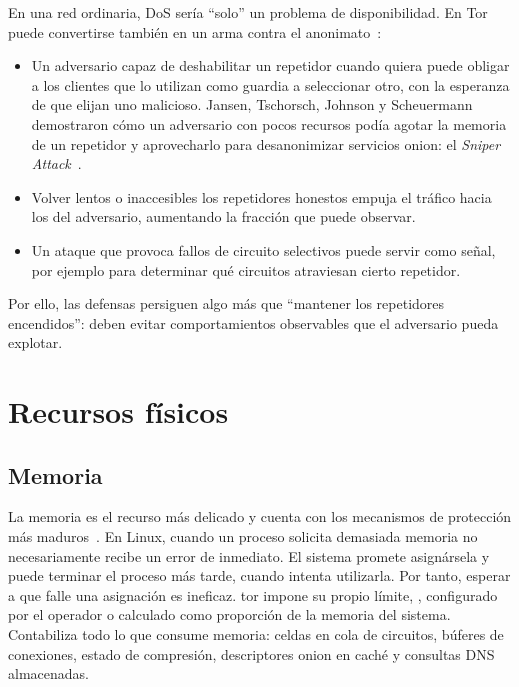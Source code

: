 En una red ordinaria, DoS sería \enquote{solo} un problema de disponibilidad. En Tor puede convertirse también en un arma contra el anonimato~:
\begin{itemize}
  \item Un adversario capaz de deshabilitar un repetidor cuando quiera puede obligar a los clientes que lo utilizan como guardia a seleccionar otro, con la esperanza de que elijan uno malicioso. Jansen, Tschorsch, Johnson y Scheuermann demostraron cómo un adversario con pocos recursos podía agotar la memoria de un repetidor y aprovecharlo para desanonimizar servicios onion: el \emph{Sniper Attack}~\cite{jansen2014sniper}.
  \item Volver lentos o inaccesibles los repetidores honestos empuja el tráfico hacia los del adversario, aumentando la fracción que puede observar.
  \item Un ataque que provoca fallos de circuito selectivos puede servir como señal, por ejemplo para determinar qué circuitos atraviesan cierto repetidor.
\end{itemize}

Por ello, las defensas persiguen algo más que \enquote{mantener los repetidores encendidos}: deben evitar comportamientos observables que el adversario pueda explotar.

\section{Recursos físicos}\label{sec:dos-risorse}

\subsection{Memoria}

La memoria es el recurso más delicado y cuenta con los mecanismos de protección más maduros~. En Linux, cuando un proceso solicita demasiada memoria no necesariamente recibe un error de inmediato. El sistema promete asignársela y puede terminar el proceso más tarde, cuando intenta utilizarla. Por tanto, esperar a que falle una asignación es ineficaz. tor impone su propio límite, , configurado por el operador o calculado como proporción de la memoria del sistema. Contabiliza todo lo que consume memoria: celdas en cola de circuitos, búferes de conexiones, estado de compresión, descriptores onion en caché y consultas DNS almacenadas.


